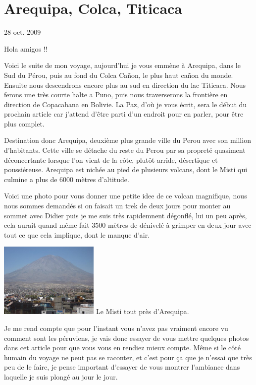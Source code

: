 \section{Arequipa, Colca, Titicaca}

28 oct. 2009

\begin{multicols}{2}

Hola amigos !!

Voici le suite de mon voyage, aujourd'hui je vous emmène à Arequipa, dans le Sud du Pérou, puis au fond du Colca Cañon, le plus haut cañon du monde. Ensuite nous descendrons encore plus au sud en direction du lac Titicaca. Nous ferons une très courte halte a Puno, puis nous traverserons la frontière en direction de Copacabana en Bolivie. La Paz, d'où je vous écrit, sera le début du prochain article car j'attend d'être parti d'un endroit pour en parler, pour être plus complet.

Destination donc Arequipa, deuxième plus grande ville du Perou avec son million d'habitants. Cette ville se détache du reste du Perou par sa propreté quasiment déconcertante lorsque l'on vient de la côte, plutôt arride, désertique et poussiéreuse. Arequipa est nichée au pied de plusieurs volcans, dont le Misti qui culmine a plus de 6000 mètres d'altitude.

Voici une photo pour vous donner une petite idee de ce volcan magnifique, nous nous sommes demandés si on faisait un trek de deux jours pour monter au sommet avec Didier puis je me suis très rapidemnent dégonflé, lui un peu après, cela aurait quand même fait 3500 mètres de dénivelé à grimper en deux jour avec tout ce que cela implique, dont le manque d'air.

\hspace*{-0.65cm}
\includegraphics[width=4.8cm]{articles/Arequipa-colca-titicaca/1256606928TSDk.jpg}
Le Misti tout près d'Arequipa.

Je me rend compte que pour l'instant vous n'avez pas vraiment encore vu comment sont les péruviens, je vais donc essayer de vous mettre quelques photos dans cet article pour que vous vous en rendiez mieux compte. Même si le côté humain du voyage ne peut pas se raconter, et c'est pour ça que je n'essai que très peu de le faire, je pense important d'essayer de vous montrer l'ambiance dans laquelle je suis plongé au jour le jour.


\end{multicols}
